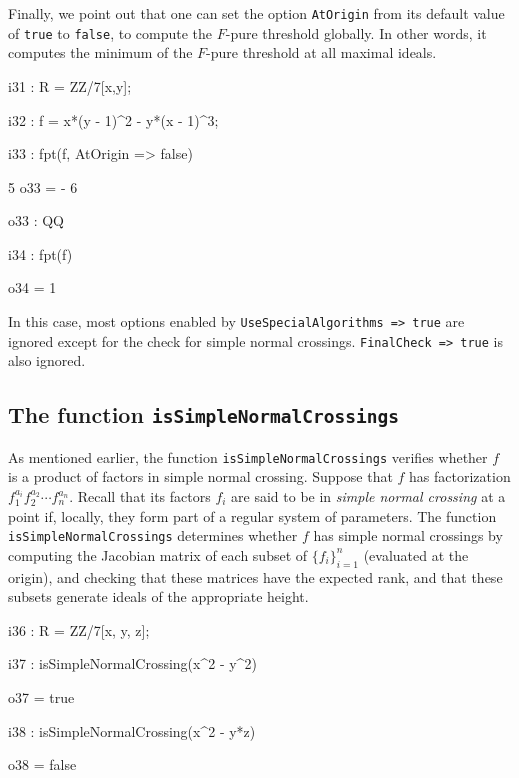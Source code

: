 \documentclass{amsart}
\begin{document}
Finally, we point out that one can set the option \texttt{AtOrigin} from its default value of \texttt{true} to \texttt{false}, to compute the $F$-pure threshold globally. In other words, it computes the minimum of the $F$-pure threshold at all maximal ideals.

\medskip
{\small
{}
\begin{MyVerbatim}
i31 : R = ZZ/7[x,y];

i32 : f = x*(y - 1)^2 - y*(x - 1)^3;

i33 : fpt(f, AtOrigin => false)

      5
o33 = -
      6

o33 : QQ

i34 : fpt(f)

o34 = 1
\end{MyVerbatim}
}
\medskip

\noindent In this case, most options enabled by \texttt{UseSpecialAlgorithms => true}
are ignored except for the check for simple normal crossings.  \texttt{FinalCheck => true}
is also ignored.

\subsection{The function \texttt{isSimpleNormalCrossings}} \label{subsec.SNC}
As mentioned earlier, the function \texttt{isSimpleNormalCrossings} verifies whether $f$ is a product of factors in simple normal crossing.
Suppose that $f$ has factorization $f_1^{a_i} f_2^{a_2} \cdots f_n^{a_n}$.  Recall that its factors $f_i$ are said to be in
\emph{simple normal crossing} at a point if, locally, they form part of a regular system of parameters.  The function \texttt{isSimpleNormalCrossings} determines whether $f$ has simple normal crossings by computing the Jacobian matrix of each subset of $\{ f_i \}_{i=1}^n$ (evaluated at the origin), and checking that these matrices have the expected rank, and that these subsets generate ideals of the appropriate height.

\medskip
{\small
{}
\begin{MyVerbatim}
i36 : R = ZZ/7[x, y, z];

i37 : isSimpleNormalCrossing(x^2 - y^2)

o37 = true

i38 : isSimpleNormalCrossing(x^2 - y*z)

o38 = false
\end{MyVerbatim}
}
\medskip

\end{document}

